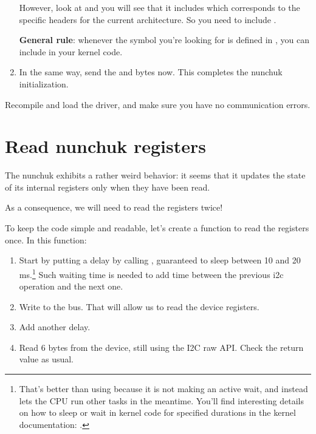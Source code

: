 \begin{enumerate}
      However, look at  and you will see
      that it includes  which corresponds to the
      specific headers for the current architecture. So you need to include
      .

      {\bf General rule}: whenever the symbol you're looking
      for is defined in , you
      can include  in your kernel code.

\item In the same way, send the  and  bytes now.
      This completes the nunchuk initialization.
\end{enumerate}

Recompile and load the driver, and make sure you have no communication
errors.

\section{Read nunchuk registers}

The nunchuk exhibits a rather weird behavior: it seems that it updates
the state of its internal registers only when they have been read.

As a consequence, we will need to read the registers twice!

To keep the code simple and readable, let's create a
 function to read the registers once.
In this function:

\begin{enumerate}
\item Start by putting a  delay by calling
      , guaranteed to sleep between 10 and 20
      ms.\footnote{That's better than using  because it is not making
      an active wait, and instead lets the CPU run other tasks in the meantime.
      You'll find interesting details on how to sleep or wait in kernel
      code for specified durations in the kernel documentation:
      .}
      Such waiting time is needed to add time between the previous i2c
      operation and the next one.
\item Write  to the bus. That will allow us to read
      the device registers.
\item Add another  delay.
\item Read 6 bytes from the device, still using the I2C raw API.
      Check the return value as usual.
\end{enumerate}

